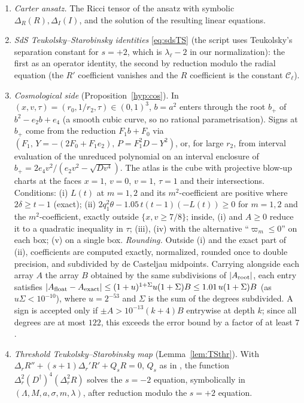 \documentclass[11pt]{amsart}
\theoremstyle{definition}
\theoremstyle{remark}
\numberwithin{equation}{section}
\begin{document}
\begin{enumerate}[label=C\arabic*.,leftmargin=*]
argument. The one input from C6 that is used, the formula $\xi_\alpha=3(\partial_\tau-i\alpha\partial_\sigma)$ in Step~1 of
Proposition~\ref{prop:stationary}, is computed exactly and symbolically in $(m,k,\epsilon,\Lambda,\alpha)$.
\item \emph{Carter ansatz.} The Ricci tensor of the ansatz with symbolic $\Delta_R(R),\Delta_I(I)$, and the solution of
the resulting linear equations.
\item \emph{SdS Teukolsky--Starobinsky identities} \eqref{eq:sdsTS} (the script uses Teukolsky's separation
constant for $s=+2$, which is $\lambda_\ell-2$ in our normalization): the first as an operator identity, the second by
reduction modulo the radial equation (the $R'$ coefficient vanishes and the $R$ coefficient is the constant
$\mathcal C_\ell$).
\item \emph{Cosmological side} (Proposition~\ref{hyp:cos}). In $(x,v,\tau)=(r_0,1/r_2,\tau)\in(0,1)^3$, $b=a^2$ enters
through the root $b_+$ of $b^2-e_2b+e_4$ (a smooth cubic curve, so no rational parametrisation). Signs at $b_+$ come
from the reduction $F_1b+F_0$ via $(F_1,\,Y=-(2F_0+F_1e_2),\,P=F_1^2D-Y^2)$, or, for large $r_2$, from interval
evaluation of the unreduced polynomial on an interval enclosure of $b_+=2e_4v^2/(e_2v^2-\sqrt{Dv^4})$. The atlas is the
cube with projective blow-up charts at the faces $x=1$, $v=0$, $v=1$, $\tau=1$ and their intersections. Conditions:
(i) $L(t)$ at $m=1,2$ and its $m^2$-coefficient are positive where $2\delta\ge t-1$ (exact);
(ii) $2q_1^2\theta-1.05\,t(t-1)(-L(t))\ge0$ for $m=1,2$ and the $m^2$-coefficient, exactly outside $\{x,v\ge7/8\}$; inside,
(i) and $A\ge0$ reduce it to a quadratic inequality in $\tau$;
(iii), (iv) with the alternative ``$\varpi_m\le0$'' on each box; (v) on a single box.
\emph{Rounding.} Outside (i) and the exact part of (ii), coefficients are computed exactly, normalized, rounded once to
double precision, and subdivided by de Casteljau midpoints. Carrying alongside each array $A$ the array $B$ obtained by
the same subdivisions of $|A_{\rm root}|$, each entry satisfies $|A_{\rm float}-A_{\rm exact}|\le(1+u)^{1+\Sigma}u(1+\Sigma)B\le1.01\,u(1+\Sigma)B$ (as $u\Sigma<10^{-10}$),
where $u=2^{-53}$ and $\Sigma$ is the sum of the degrees subdivided. A sign is accepted only if $\pm A>10^{-13}(k+4)B$
entrywise at depth $k$; since all degrees are at most $122$, this exceeds the error bound by a factor of at least $7$.
\item \emph{Threshold Teukolsky--Starobinsky map} (Lemma~\ref{lem:TSthr}). With
$\Delta_rR''+(s+1)\Delta_r'R'+Q_sR=0$, $Q_s$ as in \cite{STU98}, the function $\Delta_r^2(D^\dagger)^4(\Delta_r^2R)$ solves
the $s=-2$ equation, symbolically in $(\Lambda,M,a,\sigma,m,\lambda)$, after reduction modulo the $s=+2$ equation.
\end{enumerate}
\end{document}
